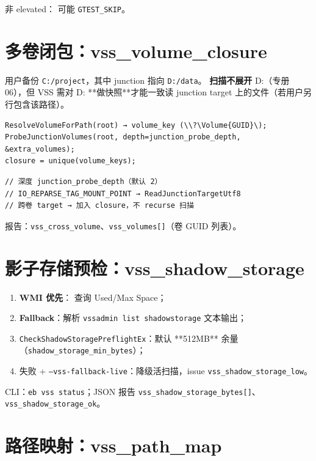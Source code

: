 非 elevated： 可能 \texttt{GTEST\_SKIP}。

\section{多卷闭包：vss\_volume\_closure}

用户备份 \texttt{C:/project}，其中 junction 指向 \texttt{D:/data}。
\textbf{扫描不展开} D:（专册 06），但 VSS 需对 D: **做快照**才能一致读 junction target 上的文件（若用户另行包含该路径）。

\begin{lstlisting}[caption={ComputeVolumeClosure（概念）}]
ResolveVolumeForPath(root) → volume_key (\\?\Volume{GUID}\);
ProbeJunctionVolumes(root, depth=junction_probe_depth, &extra_volumes);
closure = unique(volume_keys);
\end{lstlisting}

\begin{lstlisting}[caption={ProbeJunctionVolumes BFS}]
// 深度 junction_probe_depth（默认 2）
// IO_REPARSE_TAG_MOUNT_POINT → ReadJunctionTargetUtf8
// 跨卷 target → 加入 closure，不 recurse 扫描
\end{lstlisting}

报告：\texttt{vss\_cross\_volume}、\texttt{vss\_volumes[]}（卷 GUID 列表）。

\section{影子存储预检：vss\_shadow\_storage}

\begin{enumerate}
  \item \textbf{WMI 优先}： 查询 Used/Max Space；
  \item \textbf{Fallback}：解析 \texttt{vssadmin list shadowstorage} 文本输出；
  \item \texttt{CheckShadowStoragePreflightEx}：默认 **512MB** 余量（\texttt{shadow\_storage\_min\_bytes}）；
  \item 失败 + \texttt{--vss-fallback-live}：降级活扫描，issue \texttt{vss\_shadow\_storage\_low}。
\end{enumerate}

CLI：\texttt{eb vss status}；JSON 报告 \texttt{vss\_shadow\_storage\_bytes[]}、\texttt{vss\_shadow\_storage\_ok}。

\section{路径映射：vss\_path\_map}

